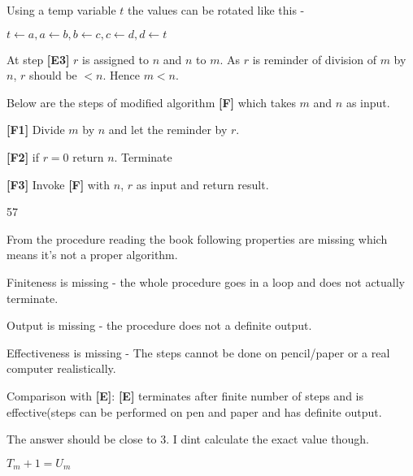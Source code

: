 \documentclass[24pt]{article}
\begin{document}
\begin{enumerate}
\begin{item}
Using a temp variable $t$ the values can be rotated like this -

$ t \leftarrow a, a \leftarrow b, b \leftarrow c, c \leftarrow d, d \leftarrow t $ 
\end{item}


\begin{item}
  At step {\bf[E3]} $r$ is assigned to $n$ and $n$ to $m$. As $r$ is reminder of division of $m$ by $n$, $r$ should be $< n$. Hence $m < n$. 
\end{item}

\begin{item}

  Below are the steps of modified algorithm {\bf[F]} which takes $m$ and $n$ as input.
  
  {\bf[F1]} Divide $m$ by $n$ and let the reminder by $r$.

  {\bf[F2]} if $r = 0$ return $n$. Terminate

  {\bf[F3]} Invoke {\bf[F]} with $n$, $r$ as input and return result.
\end{item}


\begin{item}

  57
  
\end{item}


\begin{item}

  From the procedure reading the book following properties are missing which means it's not a proper algorithm.
  \begin{itemize}
    \begin{item}
      Finiteness is missing - the whole procedure goes in a loop and does not actually terminate.
    \end{item}

    \begin{item}
      Output is missing - the procedure does not a definite output.
    \end{item}

    \begin{item}
      Effectiveness is missing - The steps cannot be done on pencil/paper or a real computer realistically.
    \end {item}

    Comparison with {\bf[E]}:
    {\bf[E]} terminates after finite number of steps and is effective(steps can be performed on pen and paper and has definite output.
  \end{itemize}
\end{item}

\begin{item}

 The answer should be close to 3. I dint calculate the exact value though.
  
\end{item}

\begin{item}

  $T_{m} +1 = U_{m}$

\end{item}


\end{enumerate}
\end{document}

